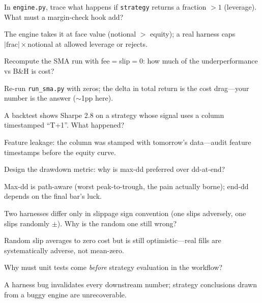 \begin{exercise}
In \texttt{engine.py}, trace what happens if \texttt{strategy} returns a fraction $>1$
(leverage). What must a margin-check hook add?
\end{exercise}
\begin{solution}
The engine takes it at face value (notional $>$ equity); a real harness caps
$|\text{frac}|\times$notional at allowed leverage or rejects.
\end{solution}

\begin{exercise}
Recompute the SMA run with fee$=$slip$=0$: how much of the underperformance vs B\&H is
cost?
\end{exercise}
\begin{solution}
Re-run \texttt{run\_sma.py} with zeros; the delta in total return is the cost drag---your
number is the answer ($\sim$1pp here).
\end{solution}

\begin{exercise}
A backtest shows Sharpe 2.8 on a strategy whose signal uses a column timestamped
``T+1''. What happened?
\end{exercise}
\begin{solution}
Feature leakage: the column was stamped with tomorrow's data---audit feature timestamps
before the equity curve.
\end{solution}

\begin{exercise}
Design the drawdown metric: why is max-dd preferred over dd-at-end?
\end{exercise}
\begin{solution}
Max-dd is path-aware (worst peak-to-trough, the pain actually borne); end-dd depends on the
final bar's luck.
\end{solution}

\begin{exercise}
Two harnesses differ only in slippage sign convention (one slips adversely, one slips
randomly $\pm$). Why is the random one still wrong?
\end{exercise}
\begin{solution}
Random slip averages to zero cost but is still optimistic---real fills are systematically
adverse, not mean-zero.
\end{solution}

\begin{exercise}
Why must unit tests come \emph{before} strategy evaluation in the workflow?
\end{exercise}
\begin{solution}
A harness bug invalidates every downstream number; strategy conclusions drawn from a buggy
engine are unrecoverable.
\end{solution}

